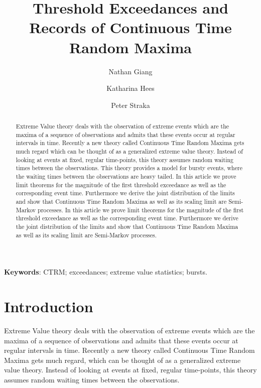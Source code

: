 \documentclass[12pt, a4paper]{article}
\title{Threshold Exceedances and Records of Continuous Time Random Maxima}
\author{Nathan Giang \and Katharina Hees \and Peter Straka}
\newcommand{\1}{\mathbf 1}
\begin{document}
\maketitle

\begin{abstract}
Extreme Value theory deals with the observation of extreme events which are the maxima of a sequence of observations and admits that these events occur at regular intervals in time. Recently a new theory called Continuous Time Random Maxima gets much regard which can be thought of as a generalized extreme value theory. Instead of looking at events at fixed, regular time-points, this theory assumes random waiting times between the observations. This theory provides a model for bursty events, where the waiting times between the observations are heavy tailed. In this article we prove limit theorems for the magnitude of the first threshold exceedance as well as the corresponding event time. Furthermore we derive the joint distribution of the limits and show that Continuous Time Random Maxima as well as its scaling limit are Semi-Markov processes. In this article we prove limit theorems for the magnitude of the first threshold exceedance as well as the corresponding event time. Furthermore we derive the joint distribution of the limits and show that Continuous Time Random Maxima as well as its scaling limit are Semi-Markov processes. 

\end{abstract}

{\bf Keywords}: CTRM; exceedances; extreme value statistics; bursts.


\setlength{\parindent}{0pt}

\section{Introduction}
Extreme Value theory deals with the observation of extreme events which are the maxima of a sequence of observations and admits that these events occur at regular intervals in time. Recently a new theory called Continuous Time Random Maxima gets much regard, which can be thought of as a generalized extreme value theory. Instead of looking at events at fixed, regular time-points, this theory assumes random waiting times between the observations.
\end{document}
